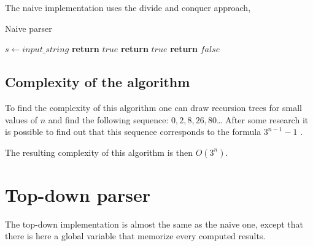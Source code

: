 The naive implementation uses the divide and conquer approach, 

\FloatBarrier
\begin{algorithm}
    \caption{Naive parser}
    \label{parse}
    \begin{algorithmic}[1]
        \State $s \gets input\_string$
         
                        \State \textbf{return} $true$
                    \EndIf
                \EndFor
            \Else
                            \State \textbf{return} $true$ 
                        \EndIf
                    \EndFor
                \EndFor
            \EndIf
            \State \textbf{return} $false$
        \EndProcedure
    \end{algorithmic}
\end{algorithm}
\FloatBarrier

\subsection{Complexity of the algorithm}

To find the complexity of this algorithm one can draw recursion trees for small values of $n$ and find the following sequence: $0, 2, 8, 26, 80$\dots
After some research it is possible to find out that this sequence corresponds to the formula $3^{n - 1} - 1$ \cite{naive_formula}.

The resulting complexity of this algorithm is then $O(3^n)$.

\section{Top-down parser}

The top-down implementation is almost the same as the naive one, except that there is here a global variable that memorize every computed results.

